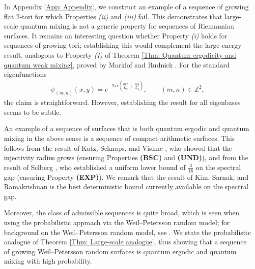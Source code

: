 \documentclass[11pt,twoside,reqno]{amsart} \usepackage{a4wide} \usepackage[T1]{fontenc} \usepackage[utf8]{inputenc} \usepackage{soul}  \usepackage{amsmath} \usepackage{amsfonts} \usepackage{amssymb} \usepackage{mathtools} \usepackage{amsthm} \usepackage{xcolor} \usepackage{graphicx} \usepackage{hyperref} \usepackage{standalone} \usepackage{esint} \usepackage{comment} \usepackage[left=2.3cm,top=3cm,right=2.3cm]{geometry} \usepackage{bm} \usepackage{svg} \usepackage{float} \numberwithin{equation}{section} \theoremstyle{plain} \newtheorem{thm}{Theorem}[section] \newtheorem{theorem}[thm]{Theorem} \newtheorem*{theorem*}{Theorem}\newtheorem{conj}[thm]{Conjecture} \newtheorem{lemma}[thm]{Lemma} \newtheorem{prop}[thm]{Proposition} \newtheorem{proposition}[thm]{Proposition} \newtheorem{cor}[thm]{Corollary} \newtheorem{question}[thm]{Question} \newtheorem{corollary}[thm]{Corollary} \newtheorem{assumption}[thm]{Assumption} \theoremstyle{definition} \newtheorem{defn}[thm]{Definition} \newtheorem{choice}[thm]{Choice} \newtheorem{definition}[thm]{Definition} \newtheorem{ex}[thm]{Example} \newtheorem{notation}[thm]{Notation} \newtheorem*{ack}{Acknowledgements} \theoremstyle{remark} \newtheorem{remark}[thm]{Remark} \newtheorem{bigremark}[thm]{Remark} \usepackage{xcolor} \newcommand{\red}[1]{ {\color{Red}#1} } \newcommand{\blue}[1]{ {\color{Blue}#1} } \author{Kai Hippi} \address{Aalto University, Espoo, Finland} \email{kai.hippi@aalto.fi}
\begin{document}
In Appendix \ref{App: Appendix}, we construct an example of a sequence of growing flat $2$-tori for which Properties \emph{(ii)} and \emph{(iii)} fail. This demonstrates that large-scale quantum mixing is not a generic property for sequences of Riemannian surfaces. It remains an interesting question whether Property \emph{(i)} holds for sequences of growing tori; establishing this would complement the large-energy result, analogous to Property \emph{(I)} of Theorem \ref{Thm: Quantum ergodicity and quantum weak mixing}, proved by Marklof and Rudnick \cite{MR12}. For the standard eigenfunctions
\begin{align*}
	\psi_{(m,n)}(x,y) = e^{-2\pi i \left( \frac{mx}{L_x} + \frac{ny}{L_y} \right)}, \qquad (m,n) \in \mathbb{Z}^2,
\end{align*}
the claim is straightforward. However, establishing the result for all eigenbases seems to be subtle.

An example of a sequence of surfaces that is both quantum ergodic and quantum mixing in the above sense is a sequence of compact arithmetic surfaces. This follows from the result of Katz, Schnaps, and Vishne \cite{KSV07}, who showed that the injectivity radius grows (ensuring Properties \textbf{(BSC)} and \textbf{(UND)}), and from the result of Selberg \cite{Sel65}, who established a uniform lower bound of $ \tfrac{3}{16} $ on the spectral gap (ensuring Property \textbf{(EXP)}). We remark that the result of Kim, Sarnak, and Ramakrishnan \cite{KRS03} is the best deterministic bound currently available on the spectral gap. 

Moreover, the class of admissible sequences is quite broad, which is seen when using the probabilistic approach via the Weil--Petersson random model; for background on the Weil--Petersson random model, see \cite{Mir13, Wri20}. We state the probabilistic analogue of Theorem \ref{Thm: Large-scale analogue}, thus showing that a sequence of growing Weil--Petersson random surfaces is quantum ergodic and quantum mixing with high probability.
\end{document}
